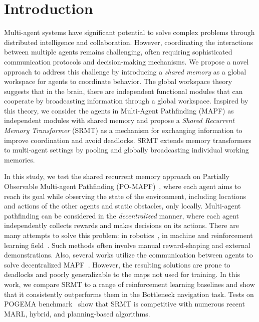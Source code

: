 \documentclass{article} %
\begin{document}
\section{Introduction}
\label{sec:intro}

Multi-agent systems have significant potential to solve complex problems through distributed intelligence and collaboration. 
However, coordinating the interactions between multiple agents remains challenging, often requiring sophisticated communication protocols and decision-making mechanisms. We propose a novel approach to address this challenge by introducing a \textit{shared memory} as a global workspace for agents to coordinate behavior. The global workspace theory~\citep{Baars1988-BAAACT} suggests that in the brain, there are independent functional modules that can cooperate by broadcasting information through a global workspace. Inspired by this theory, we consider the agents in Multi-Agent Pathfinding (MAPF) as independent modules with shared memory and propose a \textit{Shared Recurrent Memory Transformer} (SRMT) as a mechanism for exchanging information to improve coordination and avoid deadlocks. SRMT extends memory transformers~\citep{burtsev2020memory,bulatov2022recurrentmemorytransformer,yang2022transformer,cherepanov2024recurrentactiontransformermemory} to multi-agent settings by pooling and globally broadcasting individual working memories. 

In this study, we test the shared recurrent memory approach on Partially Observable Multi-agent Pathfinding (PO-MAPF)~\citep{stern2019multi}, where each agent aims to reach its goal while observing the state of the environment, including locations and actions of the other agents and static obstacles, only locally. Multi-agent pathfinding can be considered in the \textit{decentralized} manner, where each agent independently collects rewards and makes decisions on its actions. There are many attempts to solve this problem: in robotics~\citep{van2008reciprocal,zhu2022decentralized}, in machine and reinforcement learning field~\citep{damani2021primal,ma2021dcc,wang2023scrimp,sartoretti2019primal,riviere2020glas}. Such methods often involve manual reward-shaping and external demonstrations. Also, several works utilize the communication between agents to solve decentralized MAPF~\citep{ma2021distributed,Li2022MultiAgentPF,wang2023scrimp}. However, the resulting solutions are prone to deadlocks and poorly generalizable to the maps not used for training. In this work, we compare SRMT to a range of reinforcement learning baselines and show that it consistently outperforms them in the Bottleneck navigation task. Tests on POGEMA benchmark~\cite{skrynnik2024pogema} show that SRMT is competitive with numerous recent MARL, hybrid, and planning-based algorithms.
\end{document}
